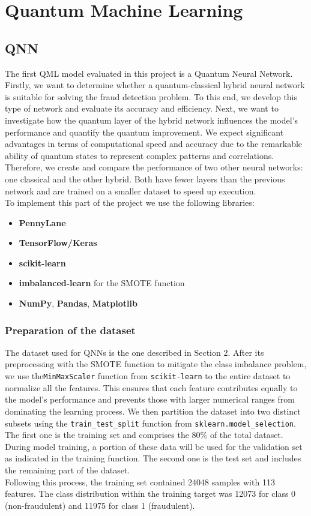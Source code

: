 \documentclass[10pt]{article}
\begin{document}
\section{Quantum Machine Learning}
\subsection{QNN}
The first QML model evaluated in this project is a Quantum Neural Network.\\
Firstly, we want to determine whether a quantum-classical hybrid neural network is suitable for solving the fraud detection problem. To this end, we develop this type of network and evaluate its accuracy and efficiency.
Next, we want to investigate how the quantum layer of the hybrid network influences the model's performance and quantify the quantum improvement. We expect significant advantages in terms of computational speed and accuracy due to the remarkable ability of quantum states to represent complex patterns and correlations.
Therefore, we create and compare the performance of two other neural networks: one classical and the other hybrid. Both have fewer layers than the previous network and are trained on a smaller dataset to speed up execution.\\
To implement this part of the project we use the following libraries:
\begin{itemize}
    \item \textbf{PennyLane}
    \item \textbf{TensorFlow/Keras}
    \item \textbf{scikit-learn}
    \item \textbf{imbalanced-learn} for the SMOTE function
    \item \textbf{NumPy}, \textbf{Pandas}, \textbf{Matplotlib}
\end{itemize}

\subsubsection{Preparation of the dataset}
The dataset used for QNNs is the one described in Section 2. After its preprocessing with the SMOTE function to mitigate the class imbalance problem, we use the\texttt{MinMaxScaler} function from \texttt{scikit-learn} to the entire dataset to normalize all the features. This ensures that each feature contributes equally to the model's performance and prevents those with larger numerical ranges from dominating the learning process. 
We then partition the dataset into two distinct subsets using the \texttt{train\_test\_split} function from \texttt{sklearn.model\_selection}. The first one is the training set and comprises the 80\% of the total dataset. During model training, a portion of these data will be used for the validation set as indicated in the training function. The second one is the test set and includes the remaining part of the dataset. \\
Following this process, the training set contained 24048 samples with 113 features. The class distribution within the training target was 12073 for class 0 (non-fraudulent) and 11975 for class 1 (fraudulent).
\end{document}
